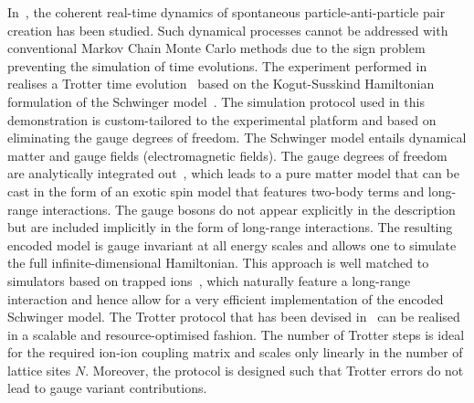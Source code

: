 \documentclass[epj,final]{svjour}
\begin{document}
In~\cite{martinez2016real,muschik2017u}, the coherent real-time dynamics of spontaneous particle-anti-particle pair creation has been studied. Such dynamical processes cannot be addressed with conventional Markov Chain Monte Carlo methods due to the sign problem~\cite{calzetta_book} preventing the simulation of time evolutions. The experiment performed in~\cite{martinez2016real,muschik2017u} realises a Trotter time evolution~\cite{Lloyd96} based on the Kogut-Susskind Hamiltonian formulation of the Schwinger model~\cite{KogutSusskindFormulation}. The simulation protocol used in this demonstration is custom-tailored to the experimental platform and based on eliminating the gauge degrees of freedom. The Schwinger model entails dynamical matter and gauge fields (electromagnetic fields). The gauge degrees of freedom are analytically integrated out~\cite{Encoding}, which leads to a pure matter model that can be cast in the form of an exotic spin model that features two-body terms and long-range interactions. The gauge bosons do not appear explicitly in the description but are included implicitly in the form of long-range interactions. The resulting encoded model is gauge invariant at all energy scales and allows one to simulate the full infinite-dimensional Hamiltonian. This approach is well matched to simulators based on trapped ions~\cite{Blatt2012,Schindler2013}, which naturally feature a long-range interaction and hence allow for a very efficient implementation of the encoded Schwinger model. The Trotter protocol that has been devised in~\cite{martinez2016real,muschik2017u} can be realised in a scalable and resource-optimised fashion. The number of Trotter steps is ideal for the required ion-ion coupling matrix and scales only linearly in the number of lattice sites $N$. Moreover, the protocol is designed such that Trotter errors do not lead to gauge variant contributions.
\end{document}

